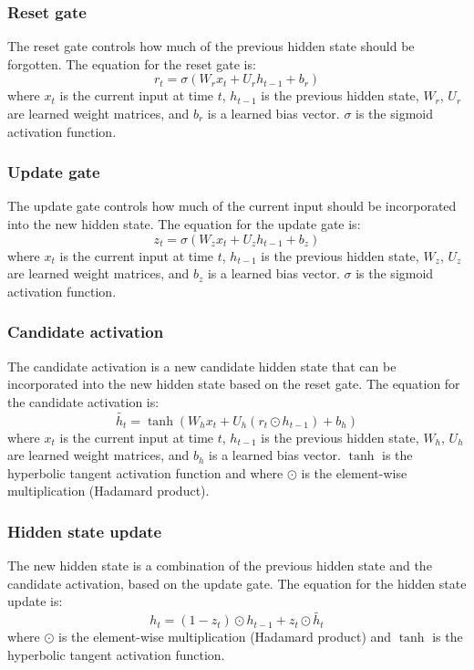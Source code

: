 \documentclass[a4paper]{sapthesis}
\begin{document}
\subsubsection{Reset gate}
The reset gate controls how much of the previous hidden state should be 
forgotten. The equation for the reset gate is:
\begin{equation}
  r_t = \sigma(W_r x_t + U_r h_{t-1} + b_r)
  \end{equation}
where $x_t$ is the current input at time $t$, $h_{t-1}$ is the previous
  hidden state, $W_r$, $U_r$ are learned weight matrices, and $b_r$ is a 
  learned bias vector. $\sigma$ is the sigmoid activation function.
\subsubsection{Update gate}
The update gate controls how much of the current input 
should be incorporated into the new hidden state. The equation for the
  update gate is:
\begin{equation}
  z_t = \sigma(W_z x_t + U_z h_{t-1} + b_z)
  \end{equation}
where $x_t$ is the current input at time $t$, $h_{t-1}$ is the previous
  hidden state, $W_z$, $U_z$ are learned weight matrices, and $b_z$ is a 
  learned bias vector. $\sigma$ is the sigmoid activation function.
\subsubsection{Candidate activation}
The candidate activation is a new candidate hidden state that can be
  incorporated into the new hidden state based on the reset gate. The
    equation for the candidate activation is:
\begin{equation}
  \tilde{h_t} = \tanh(W_h x_t + U_h (r_t \odot h_{t-1}) + b_h)
  \end{equation}
where $x_t$ is the current input at time $t$, $h_{t-1}$ is the previous
  hidden state, $W_h$, $U_h$ are learned weight matrices, and $b_h$ is a 
  learned bias vector. $\tanh$ is the hyperbolic tangent activation 
  function and where $\odot$ is the element-wise multiplication 
  (Hadamard product).
\subsubsection{Hidden state update}
The new hidden state is a combination of the previous hidden state and
  the candidate activation, based on the update gate. The equation for
    the hidden state update is:
\begin{equation}
  h_t = (1 - z_t) \odot h_{t-1} + z_t \odot \tilde{h_t}
  \end{equation}
where $\odot$ is the element-wise multiplication (Hadamard product) and 
$\tanh$ is the hyperbolic tangent activation function. 
\end{document}
